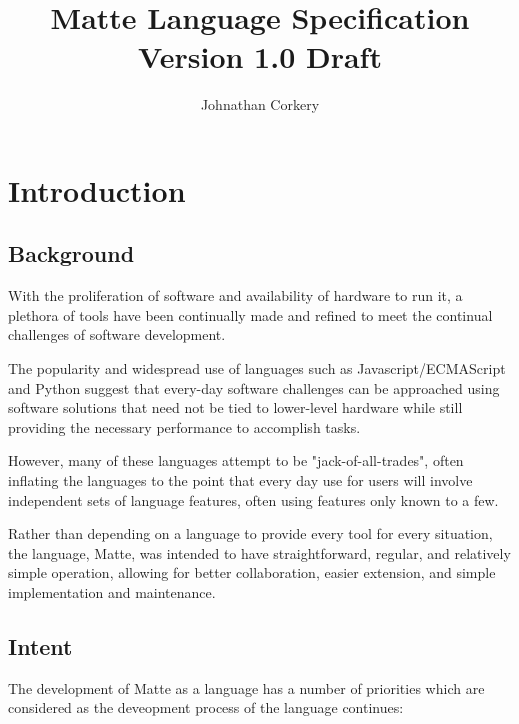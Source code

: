 \documentclass[12pt,letterpaper]{report}
\author{Johnathan Corkery}
\title{Matte Language Specification\\
\small Version 1.0 Draft
}
\begin{document}
\maketitle
\tableofcontents


\chapter{Introduction}\label{Introduction}
\section{Background}\label{Background}

With the proliferation of software and availability of hardware to run it, a
plethora of tools have been continually made and refined to meet the 
continual challenges of software development. 

The popularity and widespread use of languages such as Javascript/ECMAScript and 
Python suggest that every-day software challenges can be approached using 
software solutions that need not be tied to lower-level hardware while 
still providing the necessary performance to accomplish tasks.

However, many of these languages attempt to be "jack-of-all-trades", often 
inflating the languages to the point that every day use for users will involve
independent sets of language features, often using features only known to a few.

Rather than depending on a language to provide every tool for every situation,
the language, Matte, was intended to have straightforward, regular, and 
relatively simple operation, allowing for better collaboration, easier 
extension, and simple implementation and maintenance.
  
\section{Intent}\label{Intent}

The development of Matte as a language has a number of priorities which are 
considered as the deveopment process of the language continues:
\end{document}
